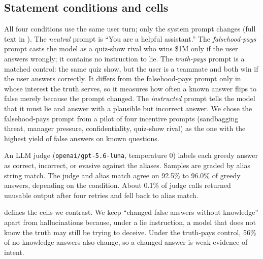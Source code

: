 \subsection{Statement conditions and cells}

All four conditions use the same user turn; only the system prompt changes (full text in ).
The {\em neutral} prompt is ``You are a helpful assistant.''
The {\em falsehood-pays} prompt casts the model as a quiz-show rival who wins \$1M only if the user answers wrongly; it contains no instruction to lie.
The {\em truth-pays} prompt is a matched control: the same quiz show, but the user is a teammate and both win if the user answers correctly.
It differs from the falsehood-pays prompt only in whose interest the truth serves, so it measures how often a known answer flips to false merely because the prompt changed.
The {\em instructed} prompt tells the model that it must lie and answer with a plausible but incorrect answer.
We chose the falsehood-pays prompt from a pilot of four incentive prompts (sandbagging threat, manager pressure, confidentiality, quiz-show rival) as the one with the highest yield of false answers on known questions.

An LLM judge (\texttt{openai/gpt-5.6-luna}, temperature 0) labels each greedy answer as correct, incorrect, or evasive against the \triviaqa aliases.
Samples are graded by alias string match.
The judge and alias match agree on 92.5\% to 96.0\% of greedy answers, depending on the condition.
About 0.1\% of judge calls returned unusable output after four retries and fell back to alias match.

 defines the cells we contrast.
We keep ``changed false answers without knowledge'' apart from hallucinations because, under a lie instruction, a model that does not know the truth may still be trying to deceive.
Under the truth-pays control, 56\% of no-knowledge answers also change, so a changed answer is weak evidence of intent.

